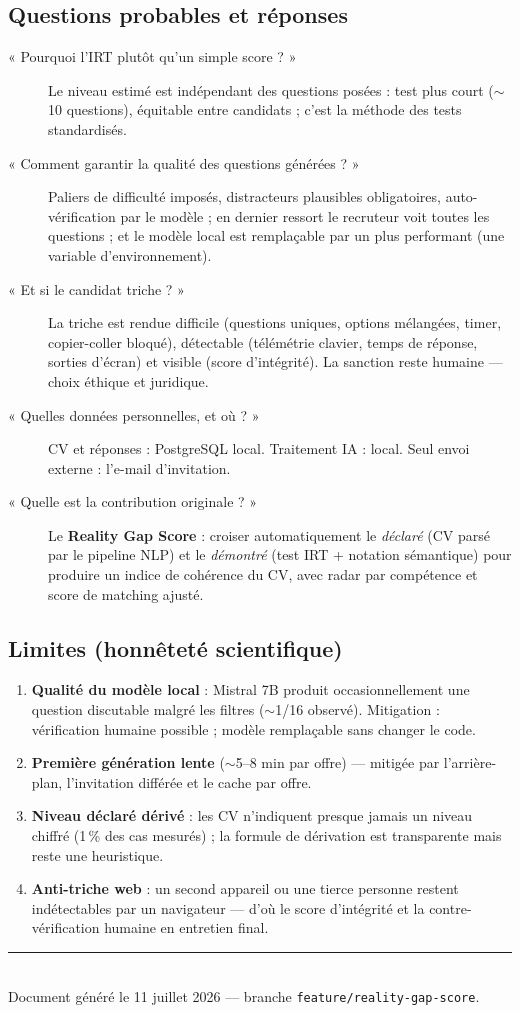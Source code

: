 \documentclass[11pt,a4paper]{article}
\begin{document}
\subsection{Questions probables et réponses}
\begin{description}
  \item[« Pourquoi l'IRT plutôt qu'un simple score ? »] Le niveau estimé est indépendant
        des questions posées : test plus court ($\sim$10 questions), équitable entre
        candidats ; c'est la méthode des tests standardisés.
  \item[« Comment garantir la qualité des questions générées ? »] Paliers de difficulté
        imposés, distracteurs plausibles obligatoires, auto-vérification par le modèle ;
        en dernier ressort le recruteur voit toutes les questions ; et le modèle local
        est remplaçable par un plus performant (une variable d'environnement).
  \item[« Et si le candidat triche ? »] La triche est rendue difficile (questions
        uniques, options mélangées, timer, copier-coller bloqué), détectable (télémétrie
        clavier, temps de réponse, sorties d'écran) et visible (score d'intégrité).
        La sanction reste humaine --- choix éthique et juridique.
  \item[« Quelles données personnelles, et où ? »] CV et réponses : PostgreSQL local.
        Traitement IA : local. Seul envoi externe : l'e-mail d'invitation.
  \item[« Quelle est la contribution originale ? »] Le \textbf{Reality Gap Score} :
        croiser automatiquement le \emph{déclaré} (CV parsé par le pipeline NLP) et le
        \emph{démontré} (test IRT + notation sémantique) pour produire un indice de
        cohérence du CV, avec radar par compétence et score de matching ajusté.
\end{description}

\subsection{Limites (honnêteté scientifique)}
\begin{enumerate}
  \item \textbf{Qualité du modèle local} : Mistral 7B produit occasionnellement une
        question discutable malgré les filtres ($\sim$1/16 observé). Mitigation :
        vérification humaine possible ; modèle remplaçable sans changer le code.
  \item \textbf{Première génération lente} ($\sim$5--8 min par offre) --- mitigée par
        l'arrière-plan, l'invitation différée et le cache par offre.
  \item \textbf{Niveau déclaré dérivé} : les CV n'indiquent presque jamais un niveau
        chiffré (1\,\% des cas mesurés) ; la formule de dérivation est transparente mais
        reste une heuristique.
  \item \textbf{Anti-triche web} : un second appareil ou une tierce personne restent
        indétectables par un navigateur --- d'où le score d'intégrité et la
        contre-vérification humaine en entretien final.
\end{enumerate}

\vspace{14pt}
\begin{center}
\rule{0.5\textwidth}{0.4pt}\\[6pt]
\small Document généré le 11 juillet 2026 --- branche \texttt{feature/reality-gap-score}.
\end{center}
\end{document}
